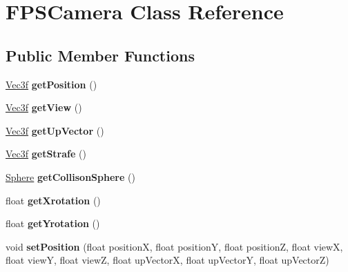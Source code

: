 \hypertarget{class_f_p_s_camera}{}\section{F\+P\+S\+Camera Class Reference}
\label{class_f_p_s_camera}
\subsection*{Public Member Functions}
\begin{DoxyCompactItemize}
\item 
\mbox{\label{class_f_p_s_camera_a3559b2ac359911c6e5dd9449fda72082}} 
\hyperlink{struct_vec3f}{Vec3f} {\bfseries get\+Position} ()
\item 
\mbox{\label{class_f_p_s_camera_a8e0c8ebfc81b01e542e9b2972c8562c1}} 
\hyperlink{struct_vec3f}{Vec3f} {\bfseries get\+View} ()
\item 
\mbox{\label{class_f_p_s_camera_a05857c6e4262f11e83d2cf824b161b0e}} 
\hyperlink{struct_vec3f}{Vec3f} {\bfseries get\+Up\+Vector} ()
\item 
\mbox{\label{class_f_p_s_camera_a131adcf4cdb53546900583556dae0071}} 
\hyperlink{struct_vec3f}{Vec3f} {\bfseries get\+Strafe} ()
\item 
\mbox{\label{class_f_p_s_camera_a96fdf7fc079dea4aa9c360e195ec9bc9}} 
\hyperlink{class_sphere}{Sphere} {\bfseries get\+Collison\+Sphere} ()
\item 
\mbox{\label{class_f_p_s_camera_a00fbb3eac9d77b41ccc71a67df9a6716}} 
float {\bfseries get\+Xrotation} ()
\item 
\mbox{\label{class_f_p_s_camera_ab2fb3b866d0e0c545f6366769e8530fc}} 
float {\bfseries get\+Yrotation} ()
\item 
\mbox{\label{class_f_p_s_camera_a3c6d11e5ad8c8417c5ad9be0d97cf4d6}} 
void {\bfseries set\+Position} (float positionX, float positionY, float positionZ, float viewX, float viewY, float viewZ, float up\+VectorX, float up\+VectorY, float up\+VectorZ)
\item 

\end{DoxyCompactItemize}
